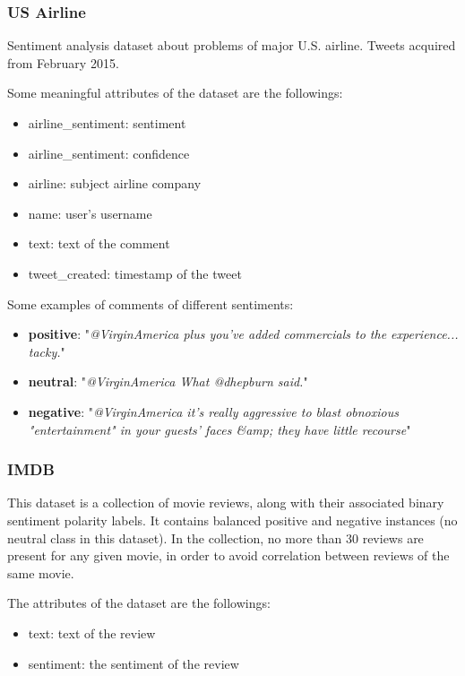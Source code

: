 \subsubsection{US Airline \cite{Rane-TSA-Airline}}
Sentiment analysis dataset about problems of major U.S. airline. Tweets acquired from February 2015.

Some meaningful attributes of the dataset are the followings:
\begin{itemize}
	\item airline\_sentiment: sentiment
	\item airline\_sentiment: confidence
	\item airline: subject airline company
	\item name: user's username
	\item text: text of the comment
	\item tweet\_created: timestamp of the tweet
\end{itemize}

Some examples of comments of different sentiments:
\begin{itemize}
	\item \textbf{positive}: "\textit{@VirginAmerica plus you've added commercials to the experience... tacky.}"
	\item \textbf{neutral}: "\textit{@VirginAmerica What @dhepburn said.}"
	\item \textbf{negative}: "\textit{@VirginAmerica it's really aggressive to blast obnoxious "entertainment" in your guests' faces \&amp; they have little recourse}"
\end{itemize}



\subsubsection{IMDB \cite{maas-EtAl:2011:ACL-HLT2011}}
This dataset is a collection of movie reviews, along with their associated binary sentiment polarity labels. It contains balanced positive and negative instances (no neutral class in this dataset). In the collection, no more than 30 reviews are present for any given movie, in order to avoid correlation between reviews of the same movie.

The attributes of the dataset are the followings:
\begin{itemize}
	\item text: text of the review
	\item sentiment: the sentiment of the review
\end{itemize}

